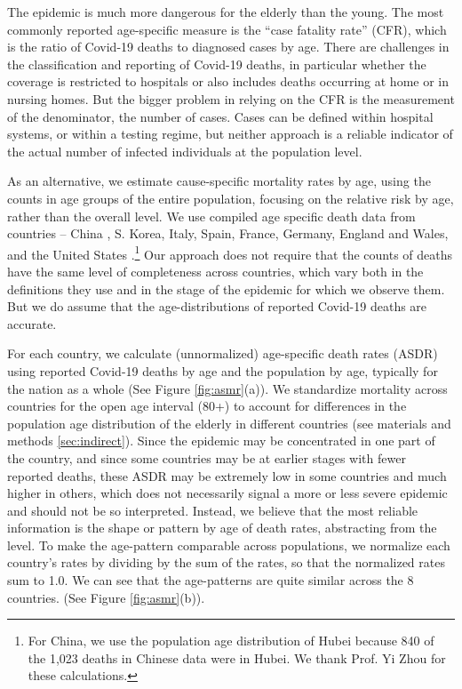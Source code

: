 \documentclass[9pt,twocolumn,twoside,lineno]{pnas-new}
\begin{document}
The epidemic is much more dangerous for the elderly than the
young. The most commonly reported age-specific measure is the ``case
fatality rate'' (CFR), which is the ratio of Covid-19 deaths to
diagnosed cases by age. There are challenges in the classification and
reporting of Covid-19 deaths, in particular whether the coverage is
restricted to hospitals or also includes deaths occurring at home or in
nursing homes. But the bigger problem in relying on the CFR is the
measurement of the denominator, the number of cases. Cases can be
defined within hospital systems, or within a testing regime, but
neither approach is a reliable indicator of the actual number of
infected individuals at the population level.


As an alternative, we estimate cause-specific mortality rates by age,
using the counts in age groups of the entire population, focusing on
the relative risk by age, rather than the overall level. We use
compiled age specific death data from countries – China
\cite{novel:2020}, S. Korea, Italy, Spain, France, Germany, England
and Wales, and the United States \cite{ined:2020}.\footnote{For China,
we use the population age distribution of Hubei because 840 of the
1,023 deaths in Chinese data were in Hubei. We thank Prof. Yi Zhou
for these calculations.} Our approach does not require that the
counts of deaths have the same level of completeness across countries,
which vary both in the definitions they use and in the stage of the
epidemic for which we observe them. But we do assume that the
age-distributions of reported Covid-19 deaths are accurate.

For each country, we calculate (unnormalized) age-specific death rates
(ASDR) using reported Covid-19 deaths by age and the population by
age, typically for the nation as a whole (See Figure \ref{fig:asmr}(a)). We
standardize mortality across countries for the open age interval (80+)
to account for differences in the population age distribution of the
elderly in different countries (see materials and methods \ref{sec:indirect}).
Since the epidemic may be concentrated in one part of the country, and since
some countries may be at earlier stages with fewer reported deaths,
these ASDR may be extremely low in some countries and much higher in
others, which does not necessarily signal a more or less severe
epidemic and should not be so interpreted. Instead, we believe that
the most reliable information is the shape or pattern by age of death
rates, abstracting from the level.  To make the age-pattern comparable
across populations, we normalize each country's rates by dividing by
the sum of the rates, so that the normalized rates sum to 1.0.  We can
see that the age-patterns are quite similar across the 8
countries. (See Figure \ref{fig:asmr}(b)).
\end{document}
